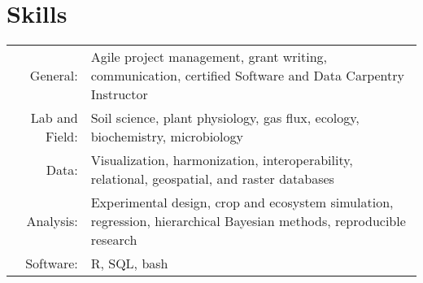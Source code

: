 \documentclass[a4paper,10pt]{article}
\begin{document}
\section{Skills}
\begin{tabular}{rp{11cm}}
General:& Agile project management, grant writing, communication, certified Software and Data Carpentry Instructor \\
Lab and Field:& Soil science, plant physiology, gas flux, ecology, biochemistry, microbiology\\
Data: & Visualization, harmonization, interoperability, relational, geospatial, and raster databases \\
Analysis: & Experimental design, crop and ecosystem simulation, regression, hierarchical Bayesian methods, reproducible research \\ 
Software:& R, SQL, bash\\

\end{tabular}
\end{document}
